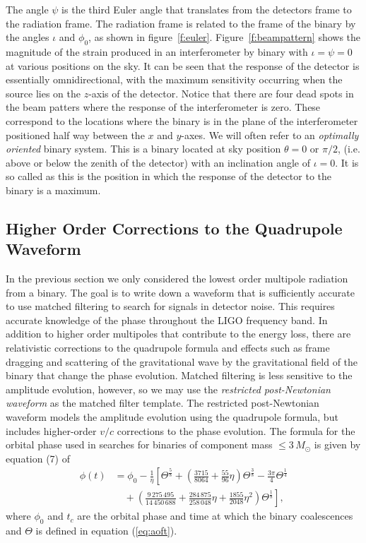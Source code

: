 The angle $\psi$ is the third Euler angle that translates from the detectors
frame to the radiation frame. The radiation frame is related to the frame of
the binary by the angles $\iota$ and $\phi_0$, as shown in
figure~\ref{f:euler}. Figure~\ref{f:beampattern} shows the magnitude of the 
strain produced in an interferometer by binary with $\iota = \psi = 0$ at
various positions on the sky. It can be seen that the response of the
detector is essentially omnidirectional, with the maximum sensitivity
occurring when the source lies on the $z$-axis of the detector. Notice that
there are four dead spots in the beam patters where the response of the
interferometer is zero. These correspond to the locations where the binary is
in the plane of the interferometer positioned half way between the $x$ and
$y$-axes. We will often refer to an \emph{optimally oriented} binary system.
This is a binary located at sky position $\theta = 0$ or $\pi/2$, (i.e. above
or below the zenith of the detector) with an inclination angle of $\iota = 0$.
It is so called as this is the position in which the response of the detector
to the binary is a maximum.

\subsection{Higher Order Corrections to the Quadrupole Waveform}

In the previous section we only considered the lowest order multipole
radiation from a binary. The goal is to write down a waveform that is
sufficiently accurate to use matched filtering to search for signals in
detector noise. This requires accurate knowledge of the phase throughout the
LIGO frequency band. In addition to higher order multipoles that contribute to the
energy loss, there are relativistic corrections to the quadrupole formula and
effects such as frame dragging and scattering of the gravitational wave by the
gravitational field of the binary that change the phase evolution. Matched
filtering is less sensitive to the amplitude evolution, however, so we may use
the \emph{restricted post-Newtonian waveform} as the matched filter template.
The restricted post-Newtonian waveform models the amplitude evolution using
the quadrupole formula, but includes higher-order $v/c$ corrections to the phase
evolution. The formula for the orbital phase used in searches for binaries of
component mass $\le 3\,M_\odot$ is given by equation (7) of
\cite{Blanchet:1996pi}
\begin{equation}
\begin{split}
\phi(t) &= \phi_0 - \frac{1}{\eta} \left[ 
\Theta^\frac{5}{8} + \left(\frac{3715}{8064} + \frac{55}{96}\eta\right)
\Theta^\frac{3}{8} - \frac{3\pi}{4} \Theta^\frac{1}{4} \right. \\
&\quad 
+\left. \left(\frac{9\,275\,495}{14\,450\,688} + \frac{284\,875}{258\,048}\eta +
\frac{1855}{2048} \eta^2\right) \Theta^\frac{1}{8} \right],
\label{eq:biwwphase}
\end{split}
\end{equation}
where 
$\phi_0$ and $t_c$ are the orbital phase and time at which the binary coalescences and
$\Theta$ is defined in equation (\ref{eq:aoft}).


